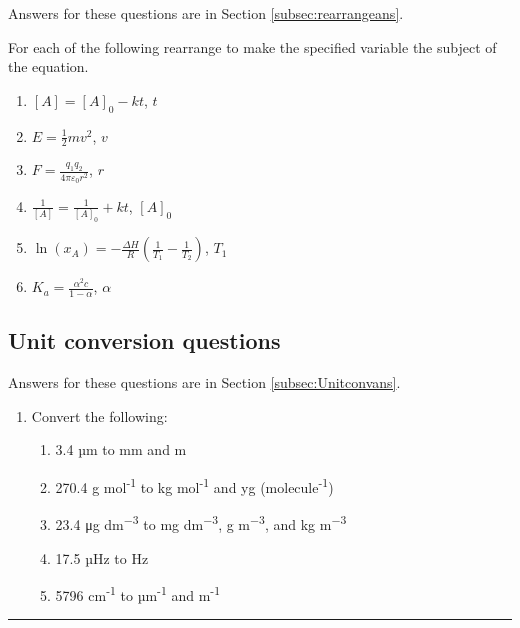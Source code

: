 \documentclass[
]{book}
\providecommand{\tightlist}{%
  \setlength{\itemsep}{0pt}\setlength{\parskip}{0pt}}
\begin{document}
Answers for these questions are in Section \ref{subsec:rearrangeans}.

For each of the following rearrange to make the specified variable the subject of the equation.

\begin{enumerate}
\def\labelenumi{\arabic{enumi}.}
\tightlist
\item
  \([A]= [A]_0 - kt\), \(t\)
\item
  \(E = \frac{1}{2}mv^2\), \(v\)
\item
  \(F = \frac{q_1 q_2}{4 \pi \varepsilon _0 r^2}\), \(r\)
\item
  \(\frac{1}{[A]}=\frac{1}{[A]_0}+kt\), \([A]_0\)
\item
  \(\ln (x_A)=-\frac{\Delta H}{R}(\frac{1}{T_1}-\frac{1}{T_2})\), \(T_1\)
\item
  \(K_a=\frac{\alpha ^2 c}{1- \alpha}\), \(\alpha\)
\end{enumerate}

\hypertarget{subsec:Unitconv}{%
\subsection{Unit conversion questions}\label{subsec:Unitconv}}

Answers for these questions are in Section \ref{subsec:Unitconvans}.

\begin{enumerate}
\def\labelenumi{\arabic{enumi}.}
\tightlist
\item
  Convert the following:

  \begin{enumerate}
  \def\labelenumii{\alph{enumii}.}
  \tightlist
  \item
    3.4 µm to mm and m
  \item
    270.4 g mol\textsuperscript{-1} to kg mol\textsuperscript{-1} and yg (molecule\textsuperscript{-1})
  \item
    23.4 μg dm\textsuperscript{−3} to mg dm\textsuperscript{−3}, g m\textsuperscript{−3}, and kg m\textsuperscript{−3}
  \item
    17.5 µHz to Hz
  \item
    5796 cm\textsuperscript{-1} to µm\textsuperscript{-1} and m\textsuperscript{-1}
  \end{enumerate}
\end{enumerate}

\begin{center}\rule{0.5\linewidth}{0.5pt}\end{center}
\end{document}
